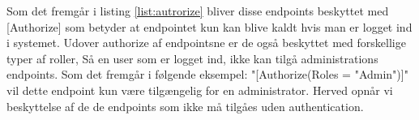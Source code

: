 
Som det fremgår i listing \ref{list:autrorize} bliver disse endpoints beskyttet med [Authorize] som betyder at
endpointet kun kan blive kaldt hvis man er logget ind i systemet. Udover authorize af endpointsne er de også beskyttet 
med forskellige typer af roller, Så en user som er logget ind, ikke kan tilgå administrations endpoints.
Som det fremgår i følgende eksempel: "[Authorize(Roles = "Admin")]" vil dette endpoint kun være tilgængelig
for en administrator. Herved opnår vi beskyttelse af de de endpoints som ikke må tilgåes uden authentication.